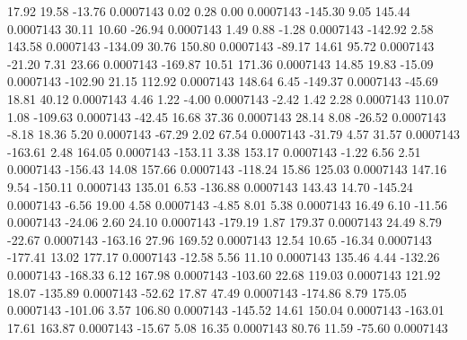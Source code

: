        17.92       19.58      -13.76     0.0007143
        0.02        0.28        0.00     0.0007143
     -145.30        9.05      145.44     0.0007143
       30.11       10.60      -26.94     0.0007143
        1.49        0.88       -1.28     0.0007143
     -142.92        2.58      143.58     0.0007143
     -134.09       30.76      150.80     0.0007143
      -89.17       14.61       95.72     0.0007143
      -21.20        7.31       23.66     0.0007143
     -169.87       10.51      171.36     0.0007143
       14.85       19.83      -15.09     0.0007143
     -102.90       21.15      112.92     0.0007143
      148.64        6.45     -149.37     0.0007143
      -45.69       18.81       40.12     0.0007143
        4.46        1.22       -4.00     0.0007143
       -2.42        1.42        2.28     0.0007143
      110.07        1.08     -109.63     0.0007143
      -42.45       16.68       37.36     0.0007143
       28.14        8.08      -26.52     0.0007143
       -8.18       18.36        5.20     0.0007143
      -67.29        2.02       67.54     0.0007143
      -31.79        4.57       31.57     0.0007143
     -163.61        2.48      164.05     0.0007143
     -153.11        3.38      153.17     0.0007143
       -1.22        6.56        2.51     0.0007143
     -156.43       14.08      157.66     0.0007143
     -118.24       15.86      125.03     0.0007143
      147.16        9.54     -150.11     0.0007143
      135.01        6.53     -136.88     0.0007143
      143.43       14.70     -145.24     0.0007143
       -6.56       19.00        4.58     0.0007143
       -4.85        8.01        5.38     0.0007143
       16.49        6.10      -11.56     0.0007143
      -24.06        2.60       24.10     0.0007143
     -179.19        1.87      179.37     0.0007143
       24.49        8.79      -22.67     0.0007143
     -163.16       27.96      169.52     0.0007143
       12.54       10.65      -16.34     0.0007143
     -177.41       13.02      177.17     0.0007143
      -12.58        5.56       11.10     0.0007143
      135.46        4.44     -132.26     0.0007143
     -168.33        6.12      167.98     0.0007143
     -103.60       22.68      119.03     0.0007143
      121.92       18.07     -135.89     0.0007143
      -52.62       17.87       47.49     0.0007143
     -174.86        8.79      175.05     0.0007143
     -101.06        3.57      106.80     0.0007143
     -145.52       14.61      150.04     0.0007143
     -163.01       17.61      163.87     0.0007143
      -15.67        5.08       16.35     0.0007143
       80.76       11.59      -75.60     0.0007143
